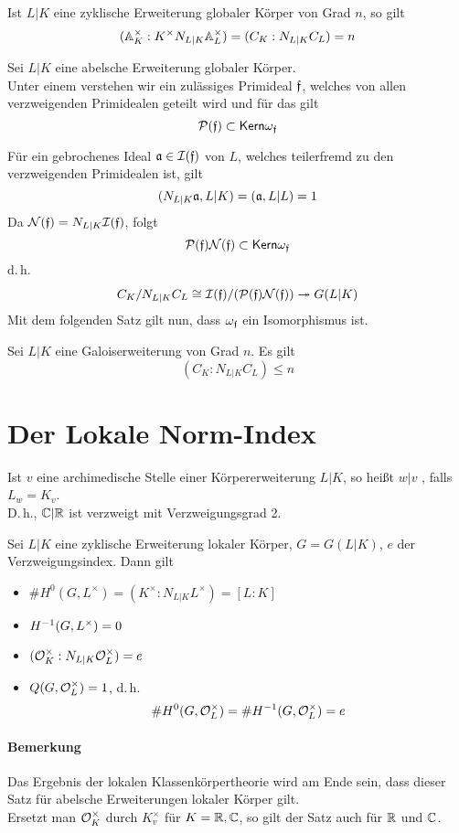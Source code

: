 \Satz{}
Ist $L|K$ eine zyklische Erweiterung globaler Körper von Grad $n$, so gilt
\[ (\mathbb{A}_K^\times : K^\times N_{L|K} \mathbb{A}_L^\times ) = (C_K : N_{L|K}C_L) = n \]

Sei $L|K$ eine abelsche Erweiterung globaler Körper.\\
Unter einem  verstehen wir ein zulässiges Primideal $\mathfrak{f}$, welches von allen verzweigenden Primidealen geteilt wird und für das gilt
\[ \mathcal{P}(\mathfrak{f}) \subset \textsf{Kern} \omega_{\mathfrak{f}} \]

\Bem{}
Für ein gebrochenes Ideal $\mathfrak{a} \in \mathcal{I}(\mathfrak{f})$ von $L$, welches teilerfremd zu den verzweigenden Primidealen ist, gilt
\[ (N_{L|K}\mathfrak{a}, L|K) = (\mathfrak{a}, L|L) = 1 \]
Da $\mathcal{N}(\mathfrak{f}) = N_{L|K} \mathcal{I}(\mathfrak{f})$, folgt
\[ \mathcal{P}(\mathfrak{f}) \mathcal{N}(\mathfrak{f}) \subset \textsf{Kern} \omega_{\mathfrak{f}}  \]
d.\,h.
\[ C_K/N_{L|K}C_L \overset{}{\cong} \mathcal{I}(\mathfrak{f}) / (\mathcal{P}(\mathfrak{f}) \mathcal{N}(\mathfrak{f})) \overset{}{\twoheadrightarrow} G(L|K) \]
Mit dem folgenden Satz gilt nun, dass $\omega_{\mathfrak{f}}$ ein Isomorphismus ist.

Sei $L|K$ eine Galoiserweiterung von Grad $n$. Es gilt
\[ (C_K : N_{L|K}C_L ) \leq n \]

\section{Der Lokale Norm-Index}

Ist $v$ eine archimedische Stelle einer Körpererweiterung $L|K$, so heißt $w|v$ , falls $L_w = K_v$.\\
D.\,h., $\mathbb{C}|\mathbb{R}$ ist verzweigt mit Verzweigungsgrad 2.

\Satz{}
Sei $L|K$ eine zyklische Erweiterung lokaler Körper, $G = G(L|K)$, $e$ der Verzweigungsindex. Dann gilt
\begin{itemize}
\item $\# H^0(G,L^\times) = (K^\times : N_{L|K}L^\times) = [L:K]$
\item $H^{-1}(G,L^\times) = 0$
\item $(\mathcal{O}_K^\times : N_{L|K}\mathcal{O}_L^\times) = e$
\item $Q(G, \mathcal{O}_L^\times) = 1$, d.\,h. 
\[ \#H^0(G, \mathcal{O}_L^\times) = \#H^{-1}(G, \mathcal{O}_L^\times) = e \]
\end{itemize}
\paragraph{Bemerkung}
Das Ergebnis der lokalen Klassenkörpertheorie wird am Ende sein, dass dieser Satz für abelsche Erweiterungen lokaler Körper gilt.\\
Ersetzt man $\mathcal{O}_K^\times$ durch $K_v^\times$ für $K = \mathbb{R},\mathbb{C}$, so gilt der Satz auch für $\mathbb{R}$ und $\mathbb{C}$.


